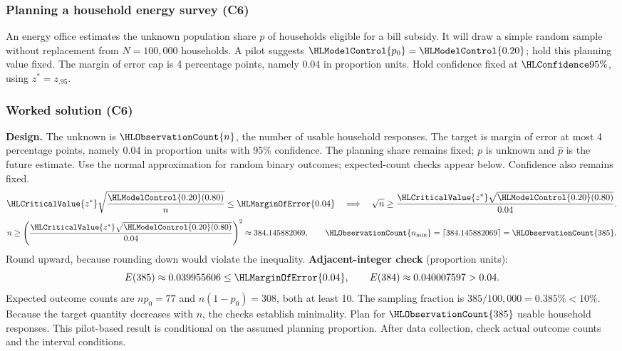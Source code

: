 \subsubsection{Planning a household energy survey (C6)}\label{prob:c6-2}
An energy office estimates the unknown population share $p$ of households eligible for a bill subsidy. It will draw a simple random sample without replacement from $N=100{,}000$ households. A pilot suggests $\HLModelControl{p_0}=\HLModelControl{0.20}$; hold this planning value fixed. The margin of error cap is 4 percentage points, namely 0.04 in proportion units. Hold confidence fixed at $\HLConfidence{95\%}$, using $z^*=z_{.95}$. 
\subsubsection*{Worked solution (C6)}\label{sol:c6-2}
\label{sol:c6-2-a}\label{sol:c6-2-b}
\textbf{Design.} The unknown is $\HLObservationCount{n}$, the number of usable household responses. The target is margin of error at most 4 percentage points, namely 0.04 in proportion units with 95\% confidence. The planning share remains fixed; $p$ is unknown and $\hat p$ is the future estimate. Use the normal approximation for random binary outcomes; expected-count checks appear below. Confidence also remains fixed. 
\[
\HLCriticalValue{z^*}\sqrt{\frac{\HLModelControl{0.20}(0.80)}{n}}\le \HLMarginOfError{0.04}\quad\Longrightarrow\quad\sqrt n\ge\frac{\HLCriticalValue{z^*}\sqrt{\HLModelControl{0.20}(0.80)}}{0.04}.
\]
\[n\ge\left(\frac{\HLCriticalValue{z^*}\sqrt{\HLModelControl{0.20}(0.80)}}{0.04}\right)^2\approx384.145882069,\qquad \HLObservationCount{n_{\min}}=\left\lceil 384.145882069\right\rceil=\HLObservationCount{385}.\]
Round upward, because rounding down would violate the inequality.
\textbf{Adjacent-integer check} (proportion units):
\[ E(385)\approx0.039955606\le \HLMarginOfError{0.04},\qquad E(384)\approx0.040007597>0.04.\]
Expected outcome counts are $np_0=77$ and $n(1-p_0)=308$, both at least 10. The sampling fraction is $385/100{,}000=0.385\%<10\%$. Because the target quantity decreases with $n$, the checks establish minimality. Plan for $\HLObservationCount{385}$ usable household responses. This pilot-based result is conditional on the assumed planning proportion. After data collection, check actual outcome counts and the interval conditions. 


